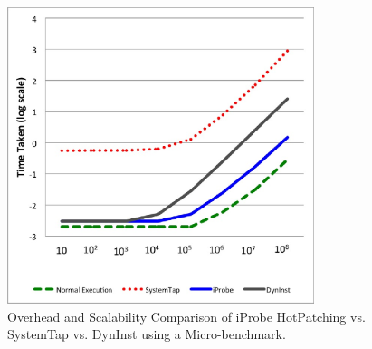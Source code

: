 \begin{figure}[h!]
  \begin{center}
    \includegraphics[width=0.8\textwidth]{iprobe/Images/scalability.eps}
    \caption{Overhead and Scalability Comparison of iProbe HotPatching vs. SystemTap vs. DynInst using a Micro-benchmark.}
    \label{fig:scalability}
  \end{center}
\end{figure}

%


